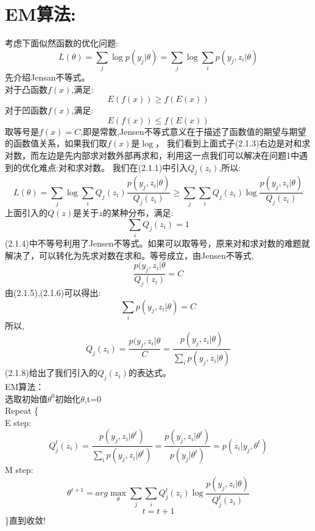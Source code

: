 \documentclass{article}
\begin{document}
\section{EM算法:}
考虑下面似然函数的优化问题:
\begin{equation}
L(\theta)=\sum_j \log p(y_j|\theta)=\sum_j \log \sum_i p(y_j,z_i|\theta) 
\tag{2.1.1}
\end{equation}
先介绍Jensan不等式。\\
对于凸函数$f(x)$,满足:
\begin{equation}
E(f(x)) \ge f(E(x)) \tag{2.1.2}
\end{equation}
对于凹函数$f(x)$,满足:
\begin{equation}
E(f(x)) \le f(E(x)) \tag{2.1.3}
\end{equation}
取等号是$f(x)=C$,即是常数,Jensen不等式意义在于描述了函数值的期望与期望的函数值关系，如果我们取$f(x)$是$\log$，
我们看到上面式子(2.1.3)右边是对和求对数，而左边是先内部求对数外部再求和，利用这一点我们可以解决在问题1中遇到的优化难点:对和求对数。
我们在(2.1.1)中引入$Q_j(z_i)$,所以:
\begin{equation}
L(\theta)=\sum_j \log \sum_i Q_j(z_i) \frac{p(y_j,z_i|\theta)}{Q_j(z_i)} \ge 
\sum_j \sum_i Q_j(z_i) \log \frac{p(y_j,z_i|\theta)}{Q_j(z_i)} \tag{2.1.4}
\end{equation}
上面引入的$Q(z)$是关于$z$的某种分布，满足:
\begin{equation}
\sum_iQ_j(z_i)=1 \tag{2.1.5}
\end{equation}
(2.1.4)中不等号利用了Jensen不等式。如果可以取等号，原来对和求对数的难题就解决了，可以转化为先求对数在求和。等号成立，由Jensen不等式,
\begin{equation}
\frac{p(y_j,z_i|\theta}{Q_j(z_i)}=C \tag{2.1.6}
\end{equation}
由(2.1.5),(2.1.6)可以得出:
\begin{equation}
\sum_ip(y_j,z_i|\theta)=C \tag{2.1.7}
\end{equation}
所以,
\begin{equation}
Q_j(z_i)=\frac{p(y_j,z_i|\theta}{C}=\frac{p(y_j,z_i|\theta)}{\sum_ip(y_j,z_i| \theta)} \tag{2.1.8}
\end{equation}
(2.1.8)给出了我们引入的$Q_j(z_i)$的表达式。\\
EM算法：\\
选取初始值$\theta^0$初始化$\theta$,t=0 \\
Repeat \{\\
E step:\\
\begin{equation}
Q_j^t(z_i)=\frac{p(y_j,z_i|\theta^t)}{\sum_ip(y_j,z_i|\theta^t)}=\frac{p(y_j,z_i|\theta^t)}{p(y_j|\theta^t)}=p(z_i|y_j,\theta^t) \tag{2.1.9}
\end{equation}
M step:
\begin{equation}
\theta^{t+1} = arg \max_{\theta} \sum_j \sum_i Q_j^t(z_i) \log \frac{p(y_j,z_i|\theta)}{Q_j^t(z_i)}  \tag{2.1.10}
\end{equation}
\begin{equation}
t = t+1 \tag{2.1.11}
\end{equation}
\}直到收敛!
\end{document}
